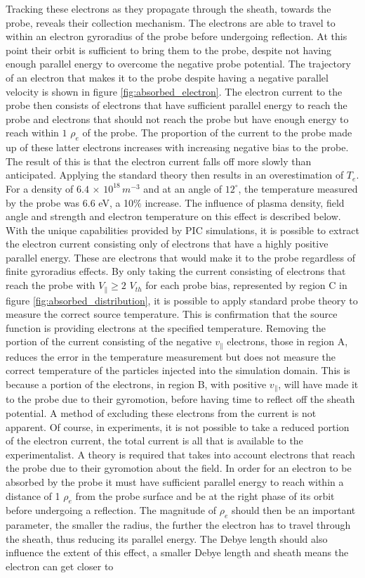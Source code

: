 Tracking these electrons as they propagate through the sheath, towards the probe, reveals their collection mechanism. The electrons are able to travel to within an electron gyroradius of the probe before undergoing reflection. At this point their orbit is sufficient to bring them to the probe, despite not having enough parallel energy to overcome the negative probe potential. The trajectory of an electron that makes it to the probe despite having a negative parallel velocity is shown in figure \ref{fig:absorbed_electron}. The electron current to the probe then consists of electrons that have sufficient parallel energy to reach the probe and electrons that should not reach the probe but have enough energy to reach within $1$ $\rho_e$ of the probe.  The proportion of the current to the probe made up of these latter electrons increases with increasing negative bias to the probe. The result of this is that the electron current falls off more slowly than anticipated. Applying the standard theory then results in an overestimation of $T_e$. For a density of $ 6.4 \, \times \, 10^{18} \, m^{-3}$ and at an angle of $12^{\circ}$, the temperature measured by the probe was 6.6 eV, a 10$\%$ increase. The influence of plasma density, field angle and strength and electron temperature on this effect is described below. With the unique capabilities provided by PIC simulations, it is possible to extract the electron current consisting only of electrons that have a highly positive parallel energy. These are electrons that would make it to the probe regardless of finite gyroradius effects. By only taking the current consisting of electrons that reach the probe with $V_\parallel \geq 2$ $V_{th}$ for each probe bias, represented by region C in figure \ref{fig:absorbed_distribution}, it is possible to apply standard probe theory to measure the correct source temperature. This is confirmation that the source function is providing electrons at the specified temperature. Removing the portion of the current consisting of the negative $v_{\parallel}$ electrons, those in region A, reduces the error in the temperature measurement but does not measure the correct temperature of the particles injected into the simulation domain. This is because a portion of the electrons, in region B, with positive $v_\parallel$, will have made it to the probe due to their gyromotion, before having time to reflect off the sheath potential. A method of excluding these electrons from the current is not apparent. Of course, in experiments, it is not possible to take a reduced portion of the electron current, the total current is all that is available to the experimentalist. A theory is required that takes into account electrons that reach the probe due to their gyromotion about the field. In order for an electron to be absorbed by the probe it must have sufficient parallel energy to reach within a distance of 1 $\rho_e$ from the probe surface and be at the right phase of its orbit before undergoing a reflection. The magnitude of $\rho_e$ should then be an important parameter, the smaller the radius, the further the electron has to travel through the sheath, thus reducing its parallel energy. The Debye length should also influence the extent of this effect, a smaller Debye length and sheath means the electron can get closer to 